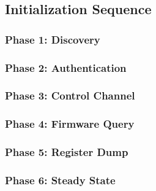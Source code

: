 \documentclass[11pt,letterpaper]{article}
\begin{document}

\subsection{Initialization Sequence}
\label{subsec:init-sequence}


\subsubsection{Phase 1: Discovery}
\label{subsubsec:init-discovery}


\subsubsection{Phase 2: Authentication}
\label{subsubsec:init-auth}


\subsubsection{Phase 3: Control Channel}
\label{subsubsec:init-control}


\subsubsection{Phase 4: Firmware Query}
\label{subsubsec:init-firmware}


\subsubsection{Phase 5: Register Dump}
\label{subsubsec:init-registers}


\subsubsection{Phase 6: Steady State}
\label{subsubsec:init-steady}

\end{document}
